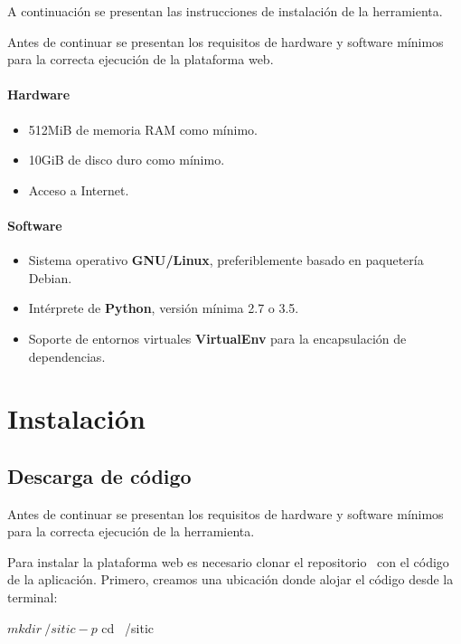 A continuación se presentan las instrucciones de instalación de la herramienta.

Antes de continuar se presentan los requisitos de hardware y software mínimos
para la correcta ejecución de la plataforma web.

\paragraph{Hardware}

\begin{itemize}
\item 512MiB de memoria RAM como mínimo.
\item 10GiB de disco duro como mínimo.
\item Acceso a Internet.
\end{itemize}

\paragraph{Software}

\begin{itemize}
\item Sistema operativo \textbf{GNU/Linux}, preferiblemente basado en paquetería Debian.
\item Intérprete de \textbf{Python}, versión mínima 2.7 o 3.5.
\item Soporte de entornos virtuales \textbf{VirtualEnv} para la encapsulación de dependencias.
\end{itemize}

\section{Instalación}

\subsection{Descarga de código}

Antes de continuar se presentan los requisitos de hardware y software mínimos
para la correcta ejecución de la herramienta.

Para instalar la plataforma web es necesario clonar el repositorio~\cite{repositorio}
con el código de la aplicación. Primero, creamos una ubicación donde alojar el
código desde la terminal:

\begin{bashcode}
    $ mkdir ~/sitic -p
    $ cd ~/sitic
\end{bashcode}

